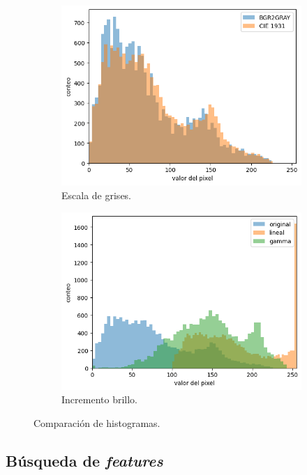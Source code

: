 \documentclass{article}
\begin{document}
\begin{figure}
  \centering
	\begin{subfigure}[b]{0.48\textwidth}
		\includegraphics[width= \textwidth]{grayHist}
		\caption{Escala de grises.}
		\label{fg:grayHist}
	\end{subfigure}
	\begin{subfigure}[b]{0.48\textwidth}
		\includegraphics[width= \textwidth]{brightHist}
		\caption{Incremento brillo.}
		\label{fg:brightHist}
	\end{subfigure}
	\caption{Comparación de histogramas.}
\end{figure}



\subsection{Búsqueda de \emph{features}}
\end{document}
